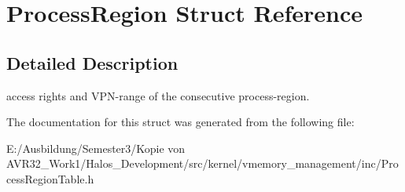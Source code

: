 \hypertarget{struct_process_region}{
\section{ProcessRegion Struct Reference}
\label{struct_process_region}
}


\subsection{Detailed Description}
access rights and VPN-range of the consecutive process-region. 

The documentation for this struct was generated from the following file:\begin{CompactItemize}
\item 
E:/Ausbildung/Semester3/Kopie von AVR32\_\-Work1/Halos\_\-Development/src/kernel/vmemory\_\-management/inc/ProcessRegionTable.h\end{CompactItemize}
